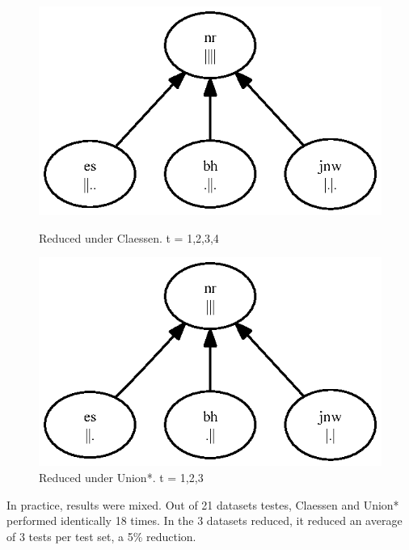 \documentclass[11pt,twoside]{article}
\begin{document}
\begin{figure}

\includegraphics{toy.ps}
\caption{Reduced under Claessen. t = {1,2,3,4}}
\includegraphics{toyb.ps}
\caption{Reduced under Union*. t = {1,2,3}}
\end{figure}


In practice, results were mixed. Out of 21 datasets testes, Claessen and Union* performed identically 18 times. In the 3 datasets reduced, it reduced an average of 3 tests per test set, a 5\% reduction.
\end{document}
